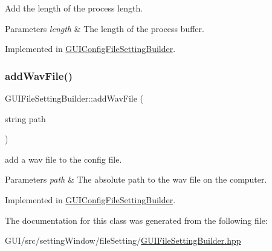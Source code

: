 Add the length of the process length. 


\begin{DoxyParams}{Parameters}
{\em length} & The length of the process\textquotesingle{} buffer. \\
\hline
\end{DoxyParams}


Implemented in \mbox{\hyperlink{class_g_u_i_config_file_setting_builder_a889dd395439312fa995862319327e425}{G\+U\+I\+Config\+File\+Setting\+Builder}}.

\mbox{\label{class_g_u_i_file_setting_builder_ac18e732eac07a5d2e5146273d60e7655}} 
\subsubsection{\texorpdfstring{add\+Wav\+File()}{addWavFile()}}
{\footnotesize\ttfamily G\+U\+I\+File\+Setting\+Builder\+::add\+Wav\+File (\begin{DoxyParamCaption}\item[{string}]{path }\end{DoxyParamCaption})\hspace{0.3cm}{\ttfamily [pure virtual]}}



add a wav file to the config file. 


\begin{DoxyParams}{Parameters}
{\em path} & The absolute path to the wav file on the computer. \\
\hline
\end{DoxyParams}


Implemented in \mbox{\hyperlink{class_g_u_i_config_file_setting_builder_a70e28ae5643efaec463e58b9bfc0d440}{G\+U\+I\+Config\+File\+Setting\+Builder}}.



The documentation for this class was generated from the following file\+:\begin{DoxyCompactItemize}
\item 
G\+U\+I/src/setting\+Window/file\+Setting/\mbox{\hyperlink{_g_u_i_file_setting_builder_8hpp}{G\+U\+I\+File\+Setting\+Builder.\+hpp}}\end{DoxyCompactItemize}
